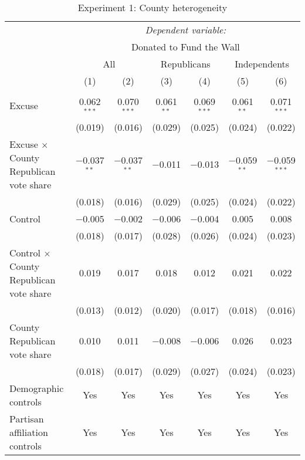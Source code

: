
\begin{table}[!htbp] \centering 
  \caption{Experiment 1: County heterogeneity} 
  \label{t:2-cityheterogeneity} 
\begin{threeparttable}
\begin{tabular}{@{\hspace{5pt}}l@{\hspace{5pt}}cccccc} 
\toprule 
 & \multicolumn{6}{c}{\textit{Dependent variable:}} \\ 
\cmidrule(rr){2-7} 
 & \multicolumn{6}{c}{Donated to Fund the Wall} \\ 
 \cmidrule(rr){2-7}
 & \multicolumn{2}{c}{All} & \multicolumn{2}{c}{Republicans} & \multicolumn{2}{c}{Independents} \\ 
 & (1) & (2) & (3) & (4) & (5) & (6)\\ 
\midrule  
\\[-2.1ex] Excuse & 0.062$^{***}$ & 0.070$^{***}$ & 0.061$^{**}$ & 0.069$^{***}$ & 0.061$^{**}$ & 0.071$^{***}$ \\ 
  & (0.019) & (0.016) & (0.029) & (0.025) & (0.024) & (0.022) \\ 
 \addlinespace 
 Excuse $\times$ County Republican vote share & $-$0.037$^{**}$ & $-$0.037$^{**}$ & $-$0.011 & $-$0.013 & $-$0.059$^{**}$ & $-$0.059$^{***}$ \\ 
  & (0.018) & (0.016) & (0.029) & (0.025) & (0.024) & (0.022) \\ 
 \addlinespace 
 Control & $-$0.005 & $-$0.002 & $-$0.006 & $-$0.004 & 0.005 & 0.008 \\ 
  & (0.018) & (0.017) & (0.028) & (0.026) & (0.024) & (0.023) \\ 
 \addlinespace 
 Control $\times$ County Republican vote share & 0.019 & 0.017 & 0.018 & 0.012 & 0.021 & 0.022 \\ 
  & (0.013) & (0.012) & (0.020) & (0.017) & (0.018) & (0.016) \\ 
 \addlinespace 
 County Republican vote share & 0.010 & 0.011 & $-$0.008 & $-$0.006 & 0.026 & 0.023 \\ 
  & (0.018) & (0.017) & (0.029) & (0.027) & (0.024) & (0.023) \\ 
 \addlinespace 
\midrule  
Demographic controls & Yes & Yes & Yes & Yes & Yes & Yes \\ 
Partisan affiliation controls & Yes & Yes & Yes & Yes & Yes & Yes \\ 

\end{tabular}
\end{threeparttable}
\end{table}
